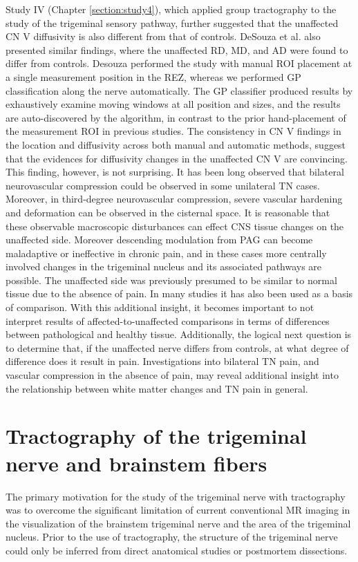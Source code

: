 Study IV (Chapter \ref{section:study4}), which applied group tractography to the study of the trigeminal sensory pathway, further suggested that the unaffected CN V diffusivity is also different from that of controls. DeSouza et al. \cite{Desouza2013} also presented similar findings, where the unaffected RD, MD, and AD were found to differ from controls. Desouza performed the study with manual ROI placement at a single measurement position in the REZ, whereas we performed GP classification along the nerve automatically. The GP classifier produced results by exhaustively examine moving windows at all position and sizes, and the results are auto-discovered by the algorithm, in contrast to the prior hand-placement of the measurement ROI in previous studies. The consistency in CN V findings in the location and diffusivity across both manual and automatic methods, suggest that the evidences for diffusivity changes in the unaffected CN V are convincing. This finding, however, is not surprising. It has been long observed that bilateral neurovascular compression could be observed in some unilateral TN cases. Moreover, in third-degree neurovascular compression, severe vascular hardening and deformation can be observed in the cisternal space. It is reasonable that these observable macroscopic disturbances can effect CNS tissue changes on the unaffected side. Moreover descending modulation from PAG can become maladaptive or ineffective in chronic pain, and in these cases more centrally involved changes in the trigeminal nucleus and its associated pathways are possible.
The unaffected side was previously presumed to be similar to normal tissue due to the absence of pain. In many studies it has also been used as a basis of comparison. With this additional insight, it becomes important to not interpret results of affected-to-unaffected comparisons in terms of differences between pathological and healthy tissue. Additionally, the logical next question is to determine that, if the unaffected nerve differs from controls, at what degree of difference does it result in pain. Investigations into bilateral TN pain, and vascular compression in the absence of pain, may reveal additional insight into the relationship between white matter changes and TN pain in general.

\section{Tractography of the trigeminal nerve and brainstem fibers}

The primary motivation for the study of the trigeminal nerve with tractography was to overcome the significant limitation of current conventional MR imaging in the visualization of the brainstem trigeminal nerve and the area of the trigeminal nucleus. Prior to the use of tractography, the structure of the trigeminal nerve could only be inferred from direct anatomical studies or postmortem dissections. 

